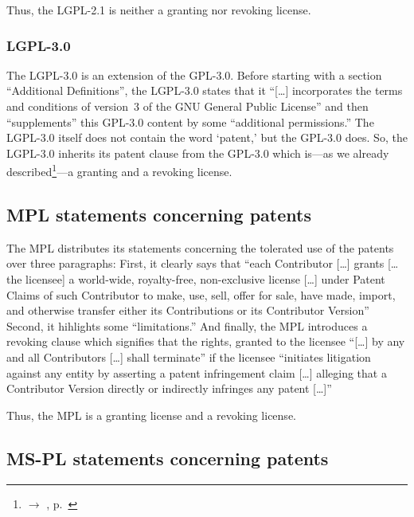 Thus, the LGPL-2.1 is neither a granting nor revoking license.

\subsubsection{LGPL-3.0}

The LGPL-3.0 is an extension of the GPL-3.0. Before starting with a section
\enquote{Additional Definitions}, the LGPL-3.0 states that it \enquote{[\ldots]
incorporates the terms and conditions of version~3 of the GNU General Public
License} and then \enquote{supplements} this GPL-3.0 content by some
\enquote{additional permissions.} The LGPL-3.0 itself does not
contain the word `patent,' but the GPL-3.0 does.
So, the LGPL-3.0 inherits its patent clause from the GPL-3.0 which is---as we
already described\footnote{$\rightarrow$ \oslic{}, p.\
}---a granting and a revoking license.
 
\subsection{MPL statements concerning patents}

The MPL distributes its statements concerning the tolerated use of the patents
over three paragraphs: First, it clearly says that \enquote{each Contributor
[\ldots] grants [\ldots the licensee] a world-wide, royalty-free,
non-exclusive license [\ldots] under Patent Claims of such Contributor to
make, use, sell, offer for sale, have made, import, and otherwise transfer
either its Contributions or its Contributor Version}\citeMPL{§2.1,
esp. §2.1.b} Second, it hihlights some \enquote{limitations.}
And finally, the MPL introduces a revoking clause which signifies that the
rights, granted to the licensee \enquote{[\ldots] by any and all Contributors
[\ldots] shall terminate} if the licensee \enquote{initiates litigation
against any entity by asserting a patent infringement claim [\ldots] alleging
that a Contributor Version directly or indirectly infringes any patent
[\ldots]}\citeMPL{§5.2}

Thus, the MPL is a granting license and a revoking license.

\subsection{MS-PL statements concerning patents}

